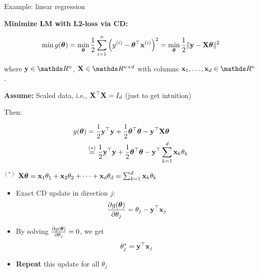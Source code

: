 \documentclass[11pt,compress,t,notes=noshow, xcolor=table]{beamer}
\begin{document}
\begin{vbframe}{Example: linear regression}

\textbf{Minimize LM with L2-loss via CD:}
\vspace*{0.2cm}

$$
    \min g(\bm{\theta}) = \min_{\bm{\theta}} \frac{1}{2}\sum\limits_{i=1}^n \left(y^{(i)} - \bm{\theta}^\top \mathbf{x}^{(i)}\right)^2 = \min_{\bm{\theta}} \frac{1}{2}\|\mathbf{y} - \mathbf{X} \bm{\theta}\|^2 
$$

where $\yv \in \R^n$, $\Xmat \in \R^{n \times d}$ with columns $\xv_1, \ldots, \xv_d \in \R^n$. 

\vspace*{0.3cm}

\textbf{Assume:} Scaled data, i.e., $\mathbf{X}^\top \mathbf{X} = I_d$ (just to get intuition)

\medskip

Then:

\vspace{-\baselineskip}

\begin{footnotesize}
\begin{align*}
    g(\bm{\theta}) &= \frac{1}{2}\mathbf{y}^\top \mathbf{y} + \frac{1}{2}\bm{\theta}^\top \bm{\theta} - \mathbf{y}^\top \mathbf{X} \bm{\theta}  \\
    &\overset{(*)}{=} \frac{1}{2}\mathbf{y}^\top \mathbf{y} + \frac{1}{2}\bm{\theta}^\top \bm{\theta} - \mathbf{y}^\top \sum_{k = 1}^d \mathbf{x}_k \theta_k 
\end{align*}

$^{(*)}$ $\mathbf{X} \bm{\theta} = \mathbf{x}_1 \theta_1 + \mathbf{x}_2 \theta_2 + \cdots + \mathbf{x}_d \theta_d = \sum_{k = 1}^d \mathbf{x}_k \theta_k$
\end{footnotesize}

\framebreak

\begin{itemize}
    \item Exact CD update in direction $j$:
        \begin{equation*}
            \frac{\partial{g}(\bm{\theta})}{\partial \theta_j} = \theta_j - \mathbf{y}^\top \mathbf{x}_j 
        \end{equation*}
    \item By solving $\frac{\partial{g}(\bm{\theta})}{\partial \theta_j} = 0$, we get 
        \begin{equation*}
            \theta_j^\ast = \mathbf{y}^\top \mathbf{x}_j
        \end{equation*}
    \item \textbf{Repeat} this update for all $\theta_j$
\end{itemize}



\end{vbframe}
\end{document}
